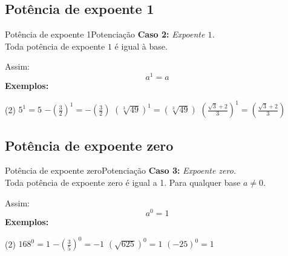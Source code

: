 \documentclass[aspectratio=169,10pt]{uu-beamer}
\begin{document}
    \subsection{Potência de expoente 1}
    \begin{frame}{Potência de expoente 1}{Potenciação}
        \textbf{Caso 2:} \textit{Expoente \(1\).}
            \vspace{.1cm} 
            \\
            Toda potência de expoente \(1\) é igual à base.
            
            Assim:
                \[ a^1 = a \]
            \textbf{Exemplos:}
                \begin{tasks}(2)
                    \task \(5^1 = 5\)
                    \task \( - \left( \frac{3}{2} \right)^1 = - \left( \frac{3}{2} \right)\)
                    \task \(\left( \sqrt[3]{49} \right)^1 = \left( \sqrt[3]{49} \right)\)
                    \task \(\left( \frac{\sqrt{3} + 2}{3} \right)^1 = \left( \frac{\sqrt{3} + 2}{3} \right)\)
                \end{tasks}
    \end{frame}
\subsection{Potência de expoente zero}
    \begin{frame}{Potência de expoente zero}{Potenciação}
        \textbf{Caso 3:} \textit{Expoente zero.}
            \vspace{.1cm} 
            \\
            Toda potência de expoente zero é igual a 1. Para qualquer base \(a \neq 0\).
            
            Assim:
                \[ a^0 = 1 \]
            \textbf{Exemplos:}
                \begin{tasks}(2)
                    \task \( 168^0 = 1 \)
                    \task \( - \left( \frac{3}{5} \right)^0 = -1 \)
                    \task \( \left( \sqrt{625} \right)^0 = 1 \)
                    \task \( (-25)^0 = 1 \)
                \end{tasks}
    \end{frame}
\end{document}
